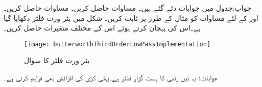 جواب:جدول  میں جوابات دئے گئے ہیں۔
مساوات  حاصل کریں۔
مساوات  حاصل کریں۔
 اور  کے لئے مساوات  کو مثال  کے طرز پر ثابت کریں۔
شکل  میں بٹر ورت فلٹر دکھایا گیا ہے۔اس کی پہچان کرتے ہوئے اس کے مختلف متغیرات حاصل کریں۔
\begin{figure}
\centering
\texttt{[image: butterworthThirdOrderLowPassImplementation]}
\caption{بٹر ورت فلٹر کا سوال}
\label{شکل_تعددی_ردعمل_سوال_تین_درجی_بٹر_ورت_فلٹر}
\end{figure}
جوابات: یہ تین رتبی  کا پست گزار فلٹر ہے۔پہلی کڑی  کی افزائش بھی فراہم کرتی ہے۔
